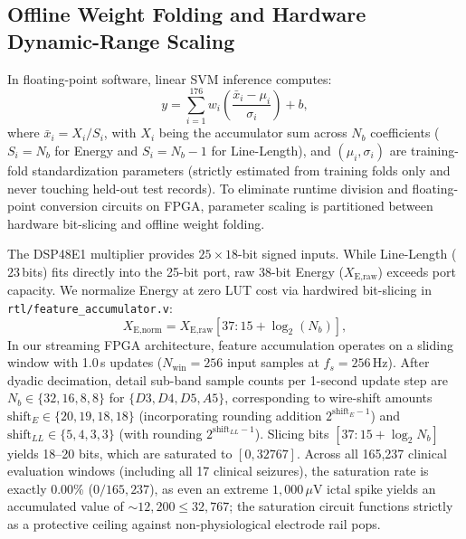 \documentclass[10pt,twocolumn,letterpaper]{article}
\begin{document}
\subsection{Offline Weight Folding and Hardware Dynamic-Range Scaling}

In floating-point software, linear SVM inference computes:
\begin{equation}
y = \sum_{i=1}^{176} w_i \left( \frac{\bar{x}_i - \mu_i}{\sigma_i} \right) + b,
\end{equation}
where $\bar{x}_i = X_i / S_i$, with $X_i$ being the accumulator sum across $N_b$ coefficients ($S_i = N_b$ for Energy and $S_i = N_b - 1$ for Line-Length), and $(\mu_i, \sigma_i)$ are training-fold standardization parameters (strictly estimated from training folds only and never touching held-out test records). To eliminate runtime division and floating-point conversion circuits on FPGA, parameter scaling is partitioned between hardware bit-slicing and offline weight folding.

The DSP48E1 multiplier provides $25 \times 18$-bit signed inputs. While Line-Length ($23$\,bits) fits directly into the 25-bit port, raw 38-bit Energy ($X_{\text{E,raw}}$) exceeds port capacity. We normalize Energy at zero LUT cost via hardwired bit-slicing in \texttt{rtl/feature\_accumulator.v}:
\begin{equation}
X_{\text{E,norm}} = X_{\text{E,raw}}[37 : 15 + \log_2(N_b)],
\end{equation}
In our streaming FPGA architecture, feature accumulation operates on a sliding window with 1.0\,s updates ($N_{\text{win}} = 256$ input samples at $f_s = 256$\,Hz). After dyadic decimation, detail sub-band sample counts per 1-second update step are $N_b \in \{32, 16, 8, 8\}$ for $\{D3, D4, D5, A5\}$, corresponding to wire-shift amounts $\text{shift}_E \in \{20, 19, 18, 18\}$ (incorporating rounding addition $2^{\text{shift}_E - 1}$) and $\text{shift}_{LL} \in \{5, 4, 3, 3\}$ (with rounding $2^{\text{shift}_{LL} - 1}$). Slicing bits $[37 : 15 + \log_2 N_b]$ yields 18--20 bits, which are saturated to $[0, 32767]$. Across all 165,237 clinical evaluation windows (including all 17 clinical seizures), the saturation rate is exactly 0.00\% ($0/165{,}237$), as even an extreme $1{,}000\,\mu$V ictal spike yields an accumulated value of $\sim 12{,}200 \le 32{,}767$; the saturation circuit functions strictly as a protective ceiling against non-physiological electrode rail pops. 
\end{document}
